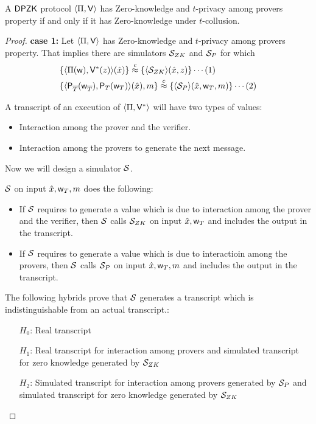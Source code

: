 \begin{theorem}\label{theo:equivalent}
	A $\mathsf{DPZK}$ protocol $\langle \Pi,\mathsf{V}\rangle$ has Zero-knowledge and $t$-privacy among provers property if and only if it has Zero-knowledge under $t$-collusion.
\end{theorem}

\begin{proof}
	\textbf{case 1:} Let $\langle \Pi,\mathsf{V}\rangle$ has Zero-knowledge and $t$-privacy among provers property. That implies there are simulators $\mathcal{S}_{ZK}$ and $\mathcal{S}_{P}$ for which 
	\begin{align*}
		&\{ \langle  \Pi( \mathsf{w} ) , \mathsf{V}^*( z ) \rangle ( \hat{x}) \} \stackrel{c}{\approx} \{ \langle \mathcal{S}_{ZK} \rangle(\hat{x}, z) \} \cdots (1)\\		
		&\{ \langle  \mathsf{P}_{\overline{T}}( \mathsf{w}_{\overline{T}} ) , \mathsf{P}_T ( \mathsf{w}_T ) \rangle ( \hat{x} ) , m \} \stackrel{c}{\approx} \{ \langle \mathcal{S}_P \rangle (\hat{x}, \mathsf{w}_T, m) \} \cdots (2)
	\end{align*}
	
	A transcript of an execution of $\langle \Pi,\mathsf{V}^*\rangle$ will have two types of values:

	\begin{itemize}
		\item Interaction among the prover and the verifier.
		\item Interaction among the provers to generate the next message.		
	\end{itemize}
	Now we will design a simulator $\mathcal{S}$.
	
	$\mathcal{S}$ on input $\hat{x}, \mathsf{w}_T, m$ does the following: 
	\begin{itemize}
		\item If $\mathcal{S}$ requires to generate a value which is due to interaction among the prover and the verifier, then $\mathcal{S}$ calls $\mathcal{S}_{ZK}$ on input $\hat{x}, \mathsf{w}_T$ and includes the output in the transcript.
		\item If $\mathcal{S}$ requires to generate a value which is due to interactioin among the provers, then $\mathcal{S}$ calls $\mathcal{S}_{P}$ on input $\hat{x}, \mathsf{w}_T, m$ and includes the output in the transcript.
	\end{itemize}
	The following hybrids prove that $\mathcal{S}$ generates a transcript which is indistinguishable from an actual transcript.:
	\begin{itemize}
		\item[$H_0$:] Real transcript
		\item[$H_1$:] Real transcript for interaction among provers and simulated transcript for zero knowledge generated by $\mathcal{S}_{ZK}$
		\item[$H_2$:] Simulated transcript for interaction among provers generated by $\mathcal{S}_P$ and simulated transcript for zero knowledge generated by $\mathcal{S}_{ZK}$
	\end{itemize}


\end{proof}
